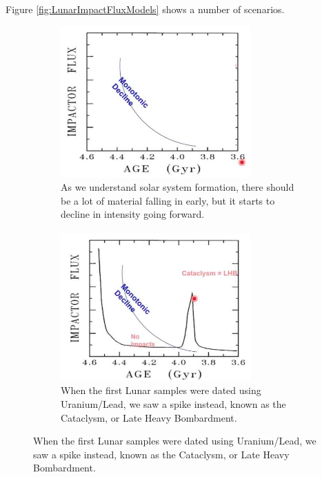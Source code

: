 \documentclass[]{article}
\begin{document}
Figure \ref{fig:LunarImpactFluxModels} shows a number of scenarios.
\begin{figure}[H]
	\caption[Lunar Impact Flux Models]{Lunar Impact Flux Models\cite{zellner2002geochemistry,hartmann1965terrestrial,hartmann1970lunar,hartmann2000time,tera1974isotopic,gomes2005origin}}\label{fig:LunarImpactFluxModels}
	\begin{subfigure}[t]{0.45\textwidth}
		\caption{As we understand solar system formation, there should be a lot of material falling in early, but it starts to decline in intensity going forward.}
		\includegraphics[width=0.8\textwidth]{LunarImpactFluxModelMonotonicDecline}
	\end{subfigure}
	\begin{subfigure}[t]{0.45\textwidth}
		\caption{When the first Lunar samples were dated using Uranium/Lead, we saw a spike instead, known as the Cataclysm, or Late Heavy Bombardment.}
		\includegraphics[width=0.8\textwidth]{LunarImpactFluxModelsWithLHB}

\end{subfigure}
\end{figure}
\end{document}
